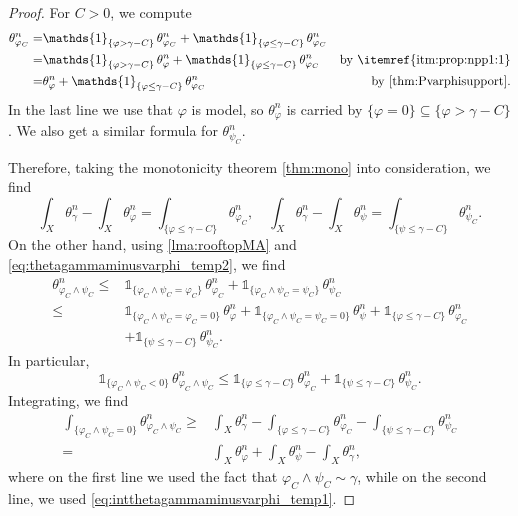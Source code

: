 \begin{proof}
    For $C>0$, we compute
    \begin{equation}\label{eq:thetagammaminusvarphi_temp2}
    \begin{aligned}
    \theta_{\varphi_C}^n=& \mathds{1}_{\{\varphi>\gamma-C\}} \,\theta_{\varphi_C}^n+ \mathds{1}_{\{\varphi\leq \gamma-C\}} \,\theta_{\varphi_C}^n &\\
    =& \mathds{1}_{\{\varphi>\gamma-C\}} \,\theta_{\varphi}^n+ \mathds{1}_{\{\varphi\leq \gamma-C\}} \,\theta_{\varphi_C}^n & \textup{by \itemref{itm:prop:npp1:1}}\\
    =& \theta_{\varphi}^n+ \mathds{1}_{\{\varphi\leq \gamma-C\}} \,\theta_{\varphi_C}^n & \textup{by \cref{thm:Pvarphisupport}}.
    \end{aligned}
\end{equation}
    In the last line we use that $\varphi$ is model, so $\theta_\varphi^n$ is carried by $\{\varphi=0\}\subseteq\{\varphi>\gamma-C\}$.
    We also get a similar formula for $\theta_{\psi_C}^n$.

    Therefore, taking the monotonicity theorem \cref{thm:mono} into consideration, we find
    \begin{equation}\label{eq:intthetagammaminusvarphi_temp1}
    \int_X \theta_{\gamma}^n-\int_X \theta_{\varphi}^n=\int_{\{\varphi\leq \gamma-C\}} \theta_{\varphi_C}^n,\quad \int_X \theta_{\gamma}^n-\int_X \theta_{\psi}^n=\int_{\{\psi\leq \gamma-C\}} \theta_{\psi_C}^n.
    \end{equation}
    On the other hand, using \cref{lma:rooftopMA} and \eqref{eq:thetagammaminusvarphi_temp2}, we find
    \[
    \begin{aligned}
    \theta_{\varphi_C\land \psi_C}^n \leq & \mathds{1}_{\{\varphi_C\land \psi_C=\varphi_C\}} \,\theta_{\varphi_C}^n+\mathds{1}_{\{\varphi_C\land \psi_C=\psi_C\}} \,\theta_{\psi_C}^n \\
    \leq & \mathds{1}_{\{\varphi_C\land \psi_C=\varphi_C=0\}}\,\theta_{\varphi}^n+\mathds{1}_{\{\varphi_C\land \psi_C=\psi_C=0\}}\,\theta_{\psi}^n+\mathds{1}_{\{\varphi\leq \gamma-C\}}\,\theta_{\varphi_C}^n\\
    &+\mathds{1}_{\{\psi\leq \gamma-C\}}\,\theta_{\psi_C}^n.
    \end{aligned}
    \]
    In particular,
    \[
    \mathds{1}_{\{ \varphi_C\land \psi_C<0 \}}\, \theta_{\varphi_C\land \psi_C}^n \leq \mathds{1}_{\{\varphi\leq \gamma-C\}}\,\theta_{\varphi_C}^n+\mathds{1}_{\{\psi\leq \gamma-C\}}\,\theta_{\psi_C}^n.
    \]
    Integrating, we find
    \[
    \begin{aligned}
    \int_{\{ \varphi_C\land \psi_C=0 \}} \theta_{\varphi_C\land \psi_C}^n
    \geq & \int_X \theta_{\gamma}^n-\int_{\{\varphi\leq \gamma-C\}} \theta_{\varphi_C}^n-\int_{\{\psi\leq \gamma-C\}} \theta_{\psi_C}^n\\
    =& \int_X \theta_{\varphi}^n+\int_X \theta_{\psi}^n-\int_X \theta_{\gamma}^n,
    \end{aligned}
    \]
    where on the first line we used the fact that $\varphi_C\land \psi_C\sim \gamma$, while on the second line, we used \eqref{eq:intthetagammaminusvarphi_temp1}.


\end{proof}
